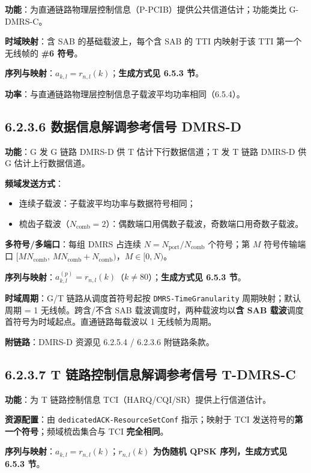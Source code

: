 \documentclass[11pt,a4paper]{ctexart}
\begin{document}
\textbf{功能}：为直通链路物理层控制信息（P-PCIB）提供公共信道估计；功能类比 G-DMRS-C。

\textbf{时域映射}：含 SAB 的基础载波上，每个含 SAB 的 TTI 内映射于该 TTI 第一个无线帧的 \textbf{\#6 符号}。

\textbf{序列与映射}：$a_{k,l}=r_{n,l}(k)$；\textbf{生成方式见 6.5.3 节}。

\textbf{功率}：与直通链路物理层控制信息子载波平均功率相同（6.5.4）。

\subsection{6.2.3.6 数据信息解调参考信号 DMRS-D}

\textbf{功能}：G 发 G 链路 DMRS-D 供 T 估计下行数据信道；T 发 T 链路 DMRS-D 供 G 估计上行数据信道。

\textbf{频域发送方式}：
\begin{itemize}[nosep]
  \item 连续子载波：子载波平均功率与数据符号相同；
  \item 梳齿子载波（$N_{\mathrm{comb}}{=}2$）：偶数端口用偶数子载波，奇数端口用奇数子载波。
\end{itemize}

\textbf{多符号/多端口}：每组 DMRS 占连续 $N=N_{\mathrm{port}}/N_{\mathrm{comb}}$ 个符号；第 $M$ 符号传输端口 $[M N_{\mathrm{comb}},\, M N_{\mathrm{comb}}+N_{\mathrm{comb}})$，$M{\in}[0,N)$。

\textbf{序列与映射}：$a_{k,l}^{(p)}=r_{n,l}(k)$（$k{\neq}80$）；\textbf{生成方式见 6.5.3 节}。

\textbf{时域周期}：G/T 链路从调度首符号起按 \texttt{DMRS-TimeGranularity} 周期映射；默认周期 = 1 无线帧。跨含/不含 SAB 载波调度时，两种载波均以\textbf{含 SAB 载波}调度首符号为时域起点。直通链路每载波以 1 无线帧为周期。

\textbf{附链路}：DMRS-D 资源见 6.2.5.4 / 6.2.3.6 附链路条款。

\subsection{6.2.3.7 T 链路控制信息解调参考信号 T-DMRS-C}

\textbf{功能}：为 T 链路控制信息 TCI（HARQ/CQI/SR）提供上行信道估计。

\textbf{资源配置}：由 \texttt{dedicatedACK-ResourceSetConf} 指示；映射于 TCI 发送符号的\textbf{第一个符号}；频域梳齿集合与 TCI \textbf{完全相同}。

\textbf{序列与映射}：$a_{k,l}=r_{n,l}(k)$；\textbf{$r_{n,l}(k)$ 为伪随机 QPSK 序列，生成方式见 6.5.3 节}。
\end{document}
